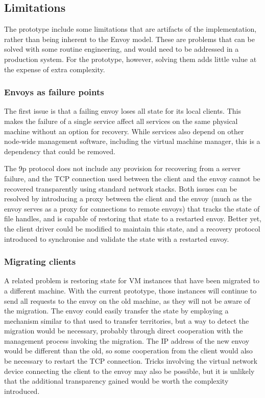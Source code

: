 \subsection{Limitations}

The prototype include some limitations that are artifacts of the implementation, rather than being inherent to the Envoy model. These are problems that can be solved with some routine engineering, and would need to be addressed in a production system. For the prototype, however, solving them adds little value at the expense of extra complexity.

\subsubsection{Envoys as failure points}

The first issue is that a failing envoy loses all state for its local clients. This makes the failure of a single service affect all services on the same physical machine without an option for recovery. While services also depend on other node-wide management software, including the virtual machine manager, this is a dependency that could be removed.

The 9p protocol does not include any provision for recovering from a server failure, and the TCP connection used between the client and the envoy cannot be recovered transparently using standard network stacks. Both issues can be resolved by introducing a proxy between the client and the envoy (much as the envoy serves as a proxy for connections to remote envoys) that tracks the state of file handles, and is capable of restoring that state to a restarted envoy. Better yet, the client driver could be modified to maintain this state, and a recovery protocol introduced to synchronise and validate the state with a restarted envoy.

\subsubsection{Migrating clients}

A related problem is restoring state for VM instances that have been migrated to a different machine. With the current prototype, those instances will continue to send all requests to the envoy on the old machine, as they will not be aware of the migration. The envoy could easily transfer the state by employing a mechanism similar to that used to transfer territories, but a way to detect the migration would be necessary, probably through direct cooperation with the management process invoking the migration. The IP address of the new envoy would be different than the old, so some cooperation from the client would also be necessary to restart the TCP connection. Tricks involving the virtual network device connecting the client to the envoy may also be possible, but it is unlikely that the additional transparency gained would be worth the complexity introduced.

